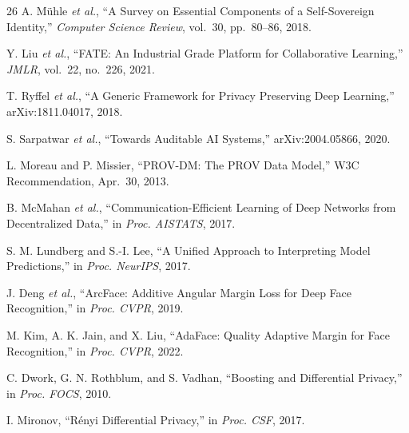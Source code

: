 \documentclass[conference]{IEEEtran}
\begin{document}
\begin{thebibliography}{26}
A. M{\"u}hle \emph{et al.}, ``A Survey on Essential Components of a Self-Sovereign Identity,'' \emph{Computer Science Review}, vol.~30, pp.~80--86, 2018.

Y. Liu \emph{et al.}, ``FATE: An Industrial Grade Platform for Collaborative Learning,'' \emph{JMLR}, vol.~22, no.~226, 2021.

T. Ryffel \emph{et al.}, ``A Generic Framework for Privacy Preserving Deep Learning,'' arXiv:1811.04017, 2018.

S. Sarpatwar \emph{et al.}, ``Towards Auditable AI Systems,'' arXiv:2004.05866, 2020.

L. Moreau and P. Missier, ``PROV-DM: The PROV Data Model,'' W3C Recommendation, Apr.~30, 2013.

B. McMahan \emph{et al.}, ``Communication-Efficient Learning of Deep Networks from Decentralized Data,'' in \emph{Proc. AISTATS}, 2017.

S. M. Lundberg and S.-I. Lee, ``A Unified Approach to Interpreting Model Predictions,'' in \emph{Proc. NeurIPS}, 2017.

J. Deng \emph{et al.}, ``ArcFace: Additive Angular Margin Loss for Deep Face Recognition,'' in \emph{Proc. CVPR}, 2019.

M. Kim, A. K. Jain, and X. Liu, ``AdaFace: Quality Adaptive Margin for Face Recognition,'' in \emph{Proc. CVPR}, 2022.

C. Dwork, G. N. Rothblum, and S. Vadhan, ``Boosting and Differential Privacy,'' in \emph{Proc. FOCS}, 2010.

I. Mironov, ``R\'{e}nyi Differential Privacy,'' in \emph{Proc. CSF}, 2017.

\end{thebibliography}
\end{document}
